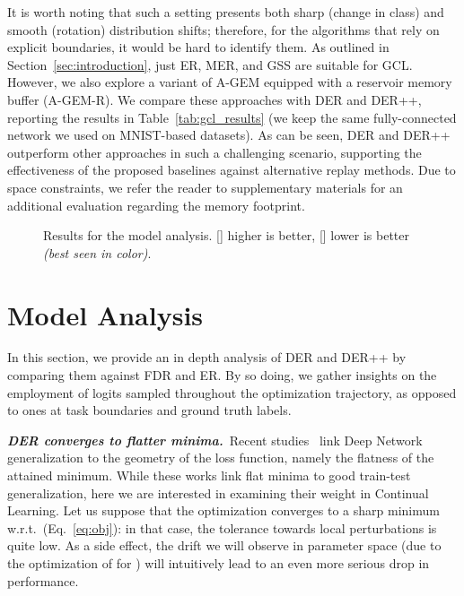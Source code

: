 \documentclass{article}
\begin{document}
It is worth noting that such a setting presents both sharp (change in class) and smooth (rotation) distribution shifts; therefore, for the algorithms that rely on explicit boundaries, it would be hard to identify them. As outlined in Section~\ref{sec:introduction}, just ER, MER, and GSS are suitable for GCL. However, we also explore a variant of A-GEM equipped with a reservoir memory buffer (A-GEM-R). We compare these approaches with DER and DER++, reporting the results in Table~\ref{tab:gcl_results} (we keep the same fully-connected network we used on MNIST-based datasets). As can be seen, DER and DER++ outperform other approaches in such a challenging scenario, supporting the effectiveness of the proposed baselines against alternative replay methods. Due to space constraints, we refer the reader to supplementary materials for an additional evaluation regarding the memory footprint.
\begin{figure}[t]
\centering
    {
    \setlength\tabcolsep{0pt}
    }
    \caption{Results for the model analysis. [] higher is better, [] lower is better \textit{(best seen in color)}.}
\vspace{-1em}
    \label{fig:plot_ablation}
\end{figure}

\section{Model Analysis}
\label{sec:ablation}
In this section, we provide an in depth analysis of DER and DER++ by comparing them against FDR and ER.
By so doing, we gather insights on the employment of logits sampled throughout the optimization trajectory, as opposed to ones at task boundaries and ground truth labels.

\textbf{\textit{DER converges to flatter minima.}}~Recent studies~\cite{chaudhari2017entropy, jastrzkebski2018three, keskar2017large} link Deep Network generalization to the geometry of the loss function, namely the flatness of the attained minimum. While these works link flat minima to good train-test generalization, here we are interested in examining their weight in Continual Learning. 
Let us suppose that the optimization converges to a sharp minimum w.r.t.\  (Eq.~\ref{eq:obj}): in that case, the tolerance towards local perturbations is quite low. As a side effect, the drift we will observe in parameter space (due to the optimization of  for ) will intuitively lead to an even more serious drop in performance.
\end{document}
